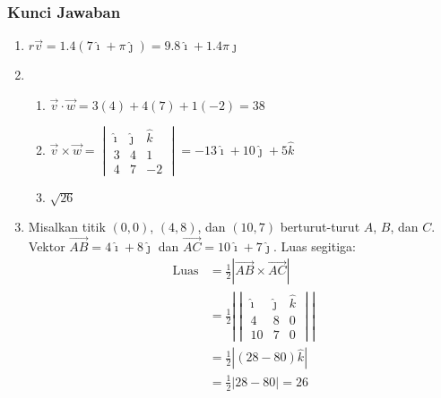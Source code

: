 \documentclass{beamer}
\begin{document}
   
 

\begin{frame}[allowframebreaks]
\frametitle{Kunci Jawaban}
\begin{enumerate}
   \item $r\vec{v} = 1.4(7\hat{\imath} + \pi\hat{\jmath}) = 9.8\hat{\imath} + 1.4\pi\hat{\jmath}$
   \item \begin{enumerate}
           \item $\vec{v} \cdot \vec{w} = 3(4) + 4(7) + 1(-2) = 38$
           \item $\vec{v} \times \vec{w} = \begin{vmatrix}
                                       \hat{\imath} & \hat{\jmath} & \hat{k} \\
                                       3 & 4 & 1 \\
                                       4 & 7 & -2
                                     \end{vmatrix} = -13\hat{\imath} + 10\hat{\jmath} + 5\hat{k}$
            \item $\sqrt{26}$
       \end{enumerate}
   \item Misalkan titik $(0, 0)$, $(4, 8)$, dan $(10, 7)$ berturut-turut $A$, $B$, dan $C$. Vektor $\vec{AB} = 4\hat{\imath} + 8\hat{\jmath}$ dan $\vec{AC} = 10\hat{\imath} + 7\hat{\jmath}$. Luas segitiga:
       \begin{align*}
           \text{Luas} &= \frac{1}{2}|\vec{AB} \times \vec{AC}| \\
                      &= \frac{1}{2}\left|\begin{vmatrix}
                                       \hat{\imath} & \hat{\jmath} & \hat{k} \\
                                       4 & 8 & 0 \\
                                       10 & 7 & 0
                                     \end{vmatrix}\right| \\
                      &= \frac{1}{2}|(28 - 80)\hat{k}| \\
                      &= \frac{1}{2}|28 - 80| = 26
       \end{align*}
\end{enumerate}
\end{frame}
\end{document}
